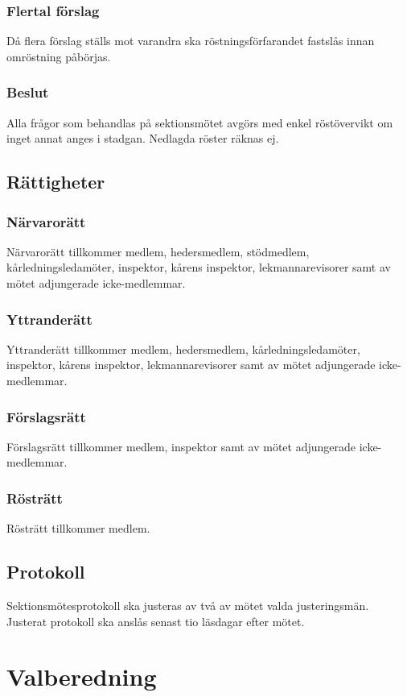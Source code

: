 \documentclass[a4paper]{dtek}
\begin{document}
\subsubsection{Flertal förslag}
Då flera förslag ställs mot varandra ska röstningsförfarandet fastslås innan omröstning påbörjas.
\subsubsection{Beslut}
Alla frågor som behandlas på sektionsmötet avgörs med enkel röstövervikt om inget annat anges i stadgan. Nedlagda röster räknas ej.
\subsection{Rättigheter}
\subsubsection{Närvarorätt}
Närvarorätt tillkommer medlem, hedersmedlem, stödmedlem, kårledningsledamöter, inspektor, kårens inspektor, lekmannarevisorer samt av mötet adjungerade icke-medlemmar.
\subsubsection{Yttranderätt}
Yttranderätt tillkommer medlem, hedersmedlem, kårledningsledamöter, inspektor, kårens inspektor, lekmannarevisorer samt av mötet adjungerade icke-medlemmar.
\subsubsection{Förslagsrätt}
Förslagsrätt tillkommer medlem, inspektor samt av mötet adjungerade icke-medlemmar.
\subsubsection{Rösträtt}
Rösträtt tillkommer medlem.
\subsection{Protokoll}
Sektionsmötesprotokoll ska justeras av två av mötet valda justeringsmän. Justerat protokoll ska anslås senast tio läsdagar efter mötet.
\newpage

\section{Valberedning}
\label{sec:valberedning}
\end{document}
